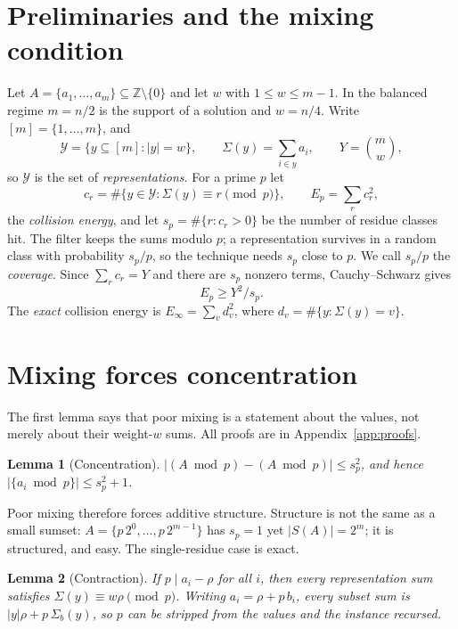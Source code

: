 \documentclass[conference]{IEEEtran}
\newtheorem{lemma}{Lemma}
\begin{document}
\section{Preliminaries and the mixing condition}\label{sec:mix}
Let $A=\{a_1,\dots,a_m\}\subseteq\mathbb Z\setminus\{0\}$ and let $w$ with
$1\le w\le m-1$. In the balanced regime $m=n/2$ is the support of a solution and
$w=n/4$. Write $[m]=\{1,\dots,m\}$, and
\[
\mathcal Y=\{y\subseteq[m]:|y|=w\},\qquad
\Sigma(y)=\sum_{i\in y}a_i,\qquad Y=\binom mw ,
\]
so $\mathcal Y$ is the set of \emph{representations}. For a prime $p$ let
\[
c_r=\#\{y\in\mathcal Y:\Sigma(y)\equiv r\!\!\pmod p\},\qquad
E_p=\sum_r c_r^2 ,
\]
the \emph{collision energy}, and let $s_p=\#\{r:c_r>0\}$ be the number of residue
classes hit. The filter keeps the sums modulo $p$; a representation survives in a
random class with probability $s_p/p$, so the technique needs $s_p$ close to $p$.
We call $s_p/p$ the \emph{coverage}. Since $\sum_r c_r=Y$ and there are $s_p$
nonzero terms, Cauchy--Schwarz gives
\begin{equation}\label{eq:cs}
E_p\ge Y^2/s_p .
\end{equation}
The \emph{exact} collision energy is $E_\infty=\sum_v d_v^2$, where
$d_v=\#\{y:\Sigma(y)=v\}$.

\section{Mixing forces concentration}\label{sec:lemmas}
The first lemma says that poor mixing is a statement about the values, not merely
about their weight-$w$ sums. All proofs are in Appendix~\ref{app:proofs}.

\begin{lemma}[Concentration]\label{lem:conc}
$|(A\bmod p)-(A\bmod p)|\le s_p^2$, and hence $|\{a_i\bmod p\}|\le s_p^2+1$.
\end{lemma}

Poor mixing therefore forces additive structure. Structure is not the same as a
small sumset: $A=\{p\,2^0,\dots,p\,2^{m-1}\}$ has $s_p=1$ yet $|S(A)|=2^m$; it is
structured, and easy. The single-residue case is exact.

\begin{lemma}[Contraction]\label{lem:contract}
If $p\mid a_i-\rho$ for all $i$, then every representation sum satisfies
$\Sigma(y)\equiv w\rho\pmod p$. Writing $a_i=\rho+p\,b_i$, every subset sum is
$|y|\rho+p\,\Sigma_b(y)$, so $p$ can be stripped from the values and the instance
recursed.
\end{lemma}
\end{document}

